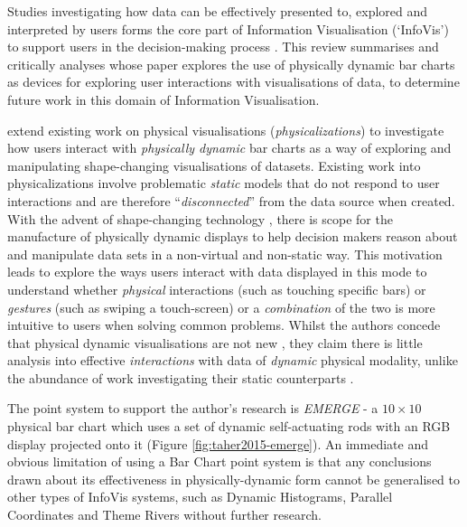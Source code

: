 \documentclass[11pt]{article}
\begin{document}

Studies investigating how data can be effectively presented to, explored and interpreted by users forms the core part of Information Visualisation (`InfoVis') to support users in the decision-making process \citep{card1997}. This review summarises and critically analyses \citet{taher2015} whose paper explores the use of physically dynamic bar charts as devices for exploring user interactions with visualisations of data, to determine future work in this domain of Information Visualisation.

\citeauthor{taher2015} extend existing work on physical visualisations (\textit{physicalizations}) \citep{jansen2015} to investigate how users interact with \textit{physically dynamic} bar charts as a way of exploring and manipulating shape-changing visualisations of datasets. Existing work into physicalizations involve problematic \textit{static} models that do not respond to user interactions \citep{jansen2013} and are therefore ``\textit{disconnected}'' from the data source when created. With the advent of shape-changing technology \citep{rasmussen2012}, there is scope for the manufacture of physically dynamic displays to help decision makers reason about and manipulate data sets in a non-virtual and non-static way. This motivation leads \citeauthor{taher2015} to explore the ways users interact with data displayed in this mode to understand whether \textit{physical} interactions (such as touching specific bars) or \textit{gestures} (such as swiping a touch-screen) or a \textit{combination} of the two is more intuitive to users when solving common problems. Whilst the authors concede that physical dynamic visualisations are not new \citep{leithinger2010,follmer2013}, they claim there is little analysis into effective \textit{interactions} with data of \textit{dynamic} physical modality, unlike the abundance of work investigating their static counterparts \citep{stusak2014}.

The point system to support the author's research is \textit{EMERGE} - a $10\times10$ physical bar chart which uses a set of dynamic self-actuating rods with an RGB display projected onto it (Figure \ref{fig:taher2015-emerge}). An immediate and obvious limitation of using a Bar Chart point system is that any conclusions drawn about its effectiveness in physically-dynamic form cannot be generalised to other types of InfoVis systems, such as Dynamic Histograms, Parallel Coordinates and Theme Rivers without further research. 
\end{document}
